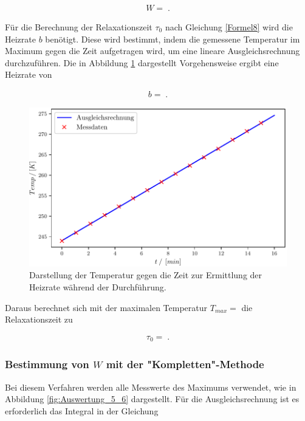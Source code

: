 \begin{align}
	W = \;.
\end{align}

Für die Berechnung der Relaxationszeit $\tau_0$ nach Gleichung \eqref{Formel8} wird die Heizrate $b$ benötigt.
Diese wird bestimmt, indem die gemessene Temperatur im Maximum gegen die Zeit aufgetragen wird, um eine lineare Ausgleichsrechnung durchzuführen. Die in Abbildung \ref{fig:Auswertung_11_12} dargestellt Vorgehensweise ergibt eine Heizrate von 

\begin{align}
	b = \;.
\end{align}


\begin{figure}[H]
  \centering
  \includegraphics[width=.75\textwidth]{build/1_Temp_Time_Peak1.pdf}
  \caption{Darstellung der Temperatur gegen die Zeit zur Ermittlung der Heizrate während der Durchführung.}
  \label{fig:Auswertung_11_12}
\end{figure}


Daraus berechnet sich mit der maximalen Temperatur $T_{max} = $ die Relaxationszeit zu

\begin{align}
	\tau_{0} = \;.
\end{align}



\subsubsection{Bestimmung von $W$ mit der "Kompletten"-Methode}

Bei diesem Verfahren werden alle Messwerte des Maximums verwendet, wie in Abbildung \ref{fig:Auswertung_5_6} dargestellt. Für die Ausgleichsrechnung ist es erforderlich das Integral in der Gleichung

